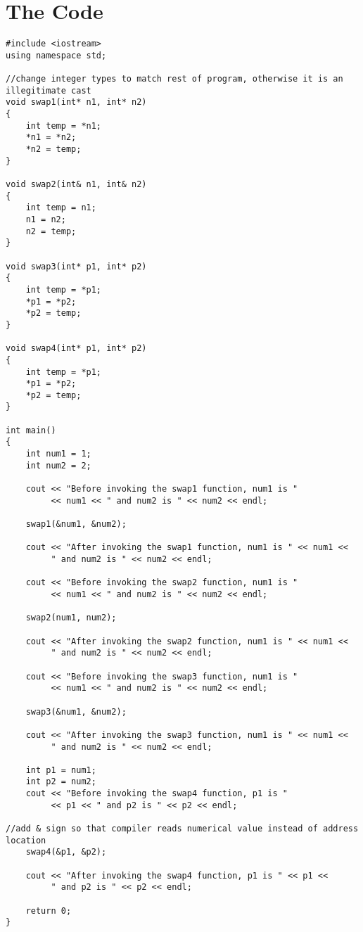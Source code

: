 \documentclass[11pt]{article}
\begin{document}
\section*{The Code}
\begin{lstlisting}
#include <iostream>
using namespace std;

//change integer types to match rest of program, otherwise it is an illegitimate cast
void swap1(int* n1, int* n2)
{
    int temp = *n1;
    *n1 = *n2;
    *n2 = temp;
}

void swap2(int& n1, int& n2)
{
    int temp = n1;
    n1 = n2;
    n2 = temp;
}

void swap3(int* p1, int* p2)
{
    int temp = *p1;
    *p1 = *p2;
    *p2 = temp;
}

void swap4(int* p1, int* p2)
{
    int temp = *p1;
    *p1 = *p2;
    *p2 = temp;
}

int main()
{
    int num1 = 1;
    int num2 = 2;

    cout << "Before invoking the swap1 function, num1 is "
         << num1 << " and num2 is " << num2 << endl;

    swap1(&num1, &num2);

    cout << "After invoking the swap1 function, num1 is " << num1 <<
         " and num2 is " << num2 << endl;

    cout << "Before invoking the swap2 function, num1 is "
         << num1 << " and num2 is " << num2 << endl;

    swap2(num1, num2);

    cout << "After invoking the swap2 function, num1 is " << num1 <<
         " and num2 is " << num2 << endl;

    cout << "Before invoking the swap3 function, num1 is "
         << num1 << " and num2 is " << num2 << endl;

    swap3(&num1, &num2);

    cout << "After invoking the swap3 function, num1 is " << num1 <<
         " and num2 is " << num2 << endl;

    int p1 = num1;
    int p2 = num2;
    cout << "Before invoking the swap4 function, p1 is "
         << p1 << " and p2 is " << p2 << endl;

//add & sign so that compiler reads numerical value instead of address location
    swap4(&p1, &p2);

    cout << "After invoking the swap4 function, p1 is " << p1 <<
         " and p2 is " << p2 << endl;

    return 0;
}

\end{lstlisting}
\end{document}
